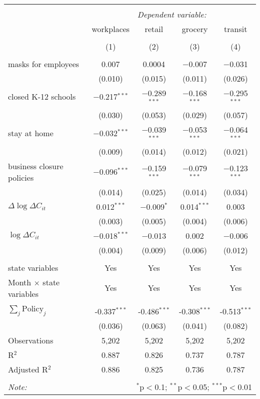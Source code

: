 \begin{tabular}{@{\extracolsep{1pt}}lcccc} 
\\[-1.8ex]\hline 
\hline \\[-1.8ex] 
 & \multicolumn{4}{c}{\textit{Dependent variable:}} \\ 
\cline{2-5} 
 & workplaces & retail & grocery & transit \\ 
\\[-1.8ex] & (1) & (2) & (3) & (4)\\ 
\hline \\[-1.8ex] 
 masks for employees & 0.007 & 0.0004 & $-$0.007 & $-$0.031 \\ 
  & (0.010) & (0.015) & (0.011) & (0.026) \\ 
  closed K-12 schools & $-$0.217$^{***}$ & $-$0.289$^{***}$ & $-$0.168$^{***}$ & $-$0.295$^{***}$ \\ 
  & (0.030) & (0.053) & (0.029) & (0.057) \\ 
  stay at home & $-$0.032$^{***}$ & $-$0.039$^{***}$ & $-$0.053$^{***}$ & $-$0.064$^{***}$ \\ 
  & (0.009) & (0.014) & (0.012) & (0.021) \\ 
  business closure policies & $-$0.096$^{***}$ & $-$0.159$^{***}$ & $-$0.079$^{***}$ & $-$0.123$^{***}$ \\ 
  & (0.014) & (0.025) & (0.014) & (0.034) \\ 
  $\Delta \log \Delta C_{it}$ & 0.012$^{***}$ & $-$0.009$^{*}$ & 0.014$^{***}$ & 0.003 \\ 
  & (0.003) & (0.005) & (0.004) & (0.006) \\ 
  $\log \Delta C_{it}$ & $-$0.018$^{***}$ & $-$0.013 & 0.002 & $-$0.006 \\ 
  & (0.004) & (0.009) & (0.006) & (0.012) \\ 
 \hline \\[-1.8ex] 
state variables & Yes & Yes & Yes & Yes \\ 
Month $\times$ state variables & Yes & Yes & Yes & Yes \\ 
\hline \\[-1.8ex] 
$\sum_j \mathrm{Policy}_j$ & -0.337$^{***}$ & -0.486$^{***}$ & -0.308$^{***}$ & -0.513$^{***}$ \\ 
 & (0.036) & (0.063) & (0.041) & (0.082) \\ 
Observations & 5,202 & 5,202 & 5,202 & 5,202 \\ 
R$^{2}$ & 0.887 & 0.826 & 0.737 & 0.787 \\ 
Adjusted R$^{2}$ & 0.886 & 0.825 & 0.736 & 0.787 \\ 
\hline 
\hline \\[-1.8ex] 
\textit{Note:}  & \multicolumn{4}{r}{$^{*}$p$<$0.1; $^{**}$p$<$0.05; $^{***}$p$<$0.01} \\ 
\end{tabular} 